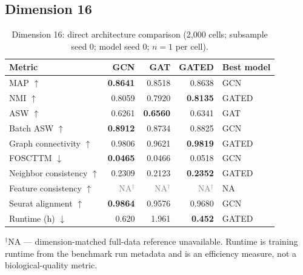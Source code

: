 \documentclass[10pt]{article}
\begin{document}
\subsection{Dimension 16}
\begin{table}[H]
\centering
\small
\caption{Dimension 16: direct architecture comparison (2,000 cells; subsample seed 0; model seed 0; $n=1$ per cell).}
\label{tab:dim16}
\begin{tabular}{@{}lrrrl@{}}
\toprule
Metric & GCN & GAT & GATED & Best model \\
\midrule
MAP $\uparrow$ & \textbf{0.8641} & 0.8518 & 0.8638 & GCN \\
NMI $\uparrow$ & 0.8059 & 0.7920 & \textbf{0.8135} & GATED \\
ASW $\uparrow$ & 0.6261 & \textbf{0.6560} & 0.6341 & GAT \\
Batch ASW $\uparrow$ & \textbf{0.8912} & 0.8734 & 0.8825 & GCN \\
Graph connectivity $\uparrow$ & 0.9806 & 0.9621 & \textbf{0.9819} & GATED \\
FOSCTTM $\downarrow$ & \textbf{0.0465} & 0.0466 & 0.0518 & GCN \\
Neighbor consistency $\uparrow$ & 0.2309 & 0.2123 & \textbf{0.2352} & GATED \\
Feature consistency $\uparrow$ & \textcolor{gray}{NA$^{\dagger}$} & \textcolor{gray}{NA$^{\dagger}$} & \textcolor{gray}{NA$^{\dagger}$} & NA \\
Seurat alignment $\uparrow$ & \textbf{0.9864} & 0.9576 & 0.9680 & GCN \\
Runtime (h) $\downarrow$ & 0.620 & 1.961 & \textbf{0.452} & GATED \\
\bottomrule
\end{tabular}
\begin{minipage}{0.92\linewidth}\footnotesize\vspace{2pt}$^{\dagger}$NA --- dimension-matched full-data reference unavailable. Runtime is training runtime from the benchmark run metadata and is an efficiency measure, not a biological-quality metric.\end{minipage}
\end{table}
\end{document}
